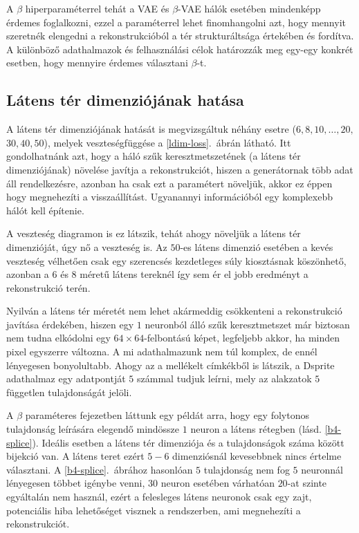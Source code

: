 A $\beta$ hiperparaméterrel tehát a VAE és $\beta$-VAE hálók esetében mindenképp érdemes foglalkozni, ezzel a paraméterrel lehet finomhangolni azt, hogy mennyit szeretnék elengedni a rekonstrukcióból a tér strukturáltsága értekében és fordítva. A különböző adathalmazok és felhasználási célok határozzák meg egy-egy konkrét esetben, hogy mennyire érdemes választani $\beta$-t.

\subsection{Látens tér dimenziójának hatása}

A látens tér dimenziójának hatását is megvizsgáltuk néhány esetre ($6, 8, 10, \dots , 20,$ $30, 40, 50$), melyek veszteségfüggése a \ref{ldim-loss}.~ábrán látható. Itt gondolhatnánk azt, hogy a háló szűk keresztmetszetének (a látens tér dimenziójának) növelése javítja a rekonstrukciót, hiszen a generátornak több adat áll rendelkezésre, azonban ha csak ezt a paramétert növeljük, akkor ez éppen hogy megnehezíti a visszaállítást. Ugyanannyi információból egy komplexebb hálót kell építenie.

A veszteség diagramon is ez látszik, tehát ahogy növeljük a látens tér dimenzióját, úgy nő a veszteség is. Az $50$-es látens dimenzió esetében a kevés veszteség vélhetően csak egy szerencsés kezdetleges súly kiosztásnak köszönhető, azonban a $6$ és $8$ méretű látens tereknél így sem ér el jobb eredményt a rekonstrukció terén. 

Nyilván a látens tér méretét nem lehet akármeddig csökkenteni a rekonstrukció javítása érdekében, hiszen egy $1$ neuronból álló szűk keresztmetszet már biztosan nem tudna elkódolni egy $64\times64$-felbontású képet, legfeljebb akkor, ha minden pixel egyszerre változna. A mi adathalmazunk nem túl komplex, de ennél lényegesen bonyolultabb. Ahogy az a mellékelt címkékből is látszik, a Dsprite adathalmaz egy adatpontját $5$ számmal tudjuk leírni, mely az alakzatok $5$ független tulajdonságát jelöli.

A $\beta$ paraméteres fejezetben láttunk egy példát arra, hogy egy folytonos tulajdonság leírására elegendő mindössze $1$ neuron a látens rétegben (lásd. \ref{b4-splice}). Ideális esetben a látens tér dimenziója és a tulajdonságok száma között bijekció van. A látens teret ezért $5-6$ dimenziósnál kevesebbnek nincs értelme választani. A \ref{b4-splice}.~ábrához hasonlóan $5$ tulajdonság nem fog $5$ neuronnál lényegesen többet igénybe venni, $30$ neuron esetében várhatóan $20$-at szinte egyáltalán nem használ, ezért a felesleges látens neuronok csak egy zajt, potenciális hiba lehetőséget visznek a rendszerben, ami megnehezíti a rekonstrukciót.

